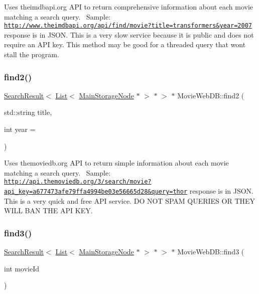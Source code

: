 Uses theimdbapi.\+org A\+PI to return comprehensive information about each movie matching a search query.~\newline
Sample\+:~\newline
\href{http://www.theimdbapi.org/api/find/movie?title=transformers&year=2007}{\tt http\+://www.\+theimdbapi.\+org/api/find/movie?title=transformers\&year=2007} response is in J\+S\+ON. This is a very slow service because it is public and does not require an A\+PI key. This method may be good for a threaded query that won\textquotesingle{}t stall the program. \mbox{\label{class_movie_web_d_b_a2beb662521e52fcfaef0261f06c5aeaa}} 
\subsubsection{\texorpdfstring{find2()}{find2()}}
{\footnotesize\ttfamily \hyperlink{class_search_result}{Search\+Result}$<$ \hyperlink{class_list}{List}$<$ \hyperlink{class_main_storage_node}{Main\+Storage\+Node} $\ast$ $>$ $\ast$ $>$ $\ast$ Movie\+Web\+D\+B\+::find2 (\begin{DoxyParamCaption}\item[{std\+::string}]{title,  }\item[{int}]{year = {} }\end{DoxyParamCaption})\hspace{0.3cm}{\ttfamily [static]}}

Uses themoviedb.\+org A\+PI to return simple information about each movie matching a search query.~\newline
Sample\+:~\newline
\href{http://api.themoviedb.org/3/search/movie?api_key=a677473afe79ffa4994be03e56665d28&query=thor}{\tt http\+://api.\+themoviedb.\+org/3/search/movie?api\+\_\+key=a677473afe79ffa4994be03e56665d28\&query=thor} response is in J\+S\+ON. This is a very quick and free A\+PI service. DO N\+OT S\+P\+AM Q\+U\+E\+R\+I\+ES OR T\+H\+EY W\+I\+LL B\+AN T\+HE A\+PI K\+EY. \mbox{\label{class_movie_web_d_b_a42c482229bd6f954d66febbeef00809b}} 
\subsubsection{\texorpdfstring{find3()}{find3()}}
{\footnotesize\ttfamily \hyperlink{class_search_result}{Search\+Result}$<$ \hyperlink{class_list}{List}$<$ \hyperlink{class_main_storage_node}{Main\+Storage\+Node} $\ast$ $>$ $\ast$ $>$ $\ast$ Movie\+Web\+D\+B\+::find3 (\begin{DoxyParamCaption}\item[{int}]{movie\+Id }\end{DoxyParamCaption})\hspace{0.3cm}{\ttfamily [static]}}

